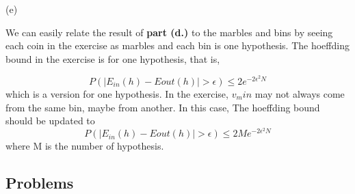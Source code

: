 \documentclass[11pt]{article}
\begin{document}
\begin{enumerate}
(e)

We can easily relate the result of \textbf{part (d.)} to the marbles and bins by seeing each coin in the exercise as marbles and each bin is one hypothesis. The hoeffding bound in the exercise is for one hypothesis, that is, 

$$P(|E_{in}(h) - E{out}(h)| > \epsilon) \leq 2e^{-2\epsilon^2 N}$$
 which is a version for one hypothesis. In the exercise, $v_min$ may not always come from the same bin, maybe from another. In this case, The hoeffding bound should be updated to $$P(|E_{in}(h) - E{out}(h)| > \epsilon) \leq 2Me^{-2\epsilon^2 N}$$ where M is the number of hypothesis.

\end{enumerate}

\pagebreak

\subsection*{Problems}
\end{document}
